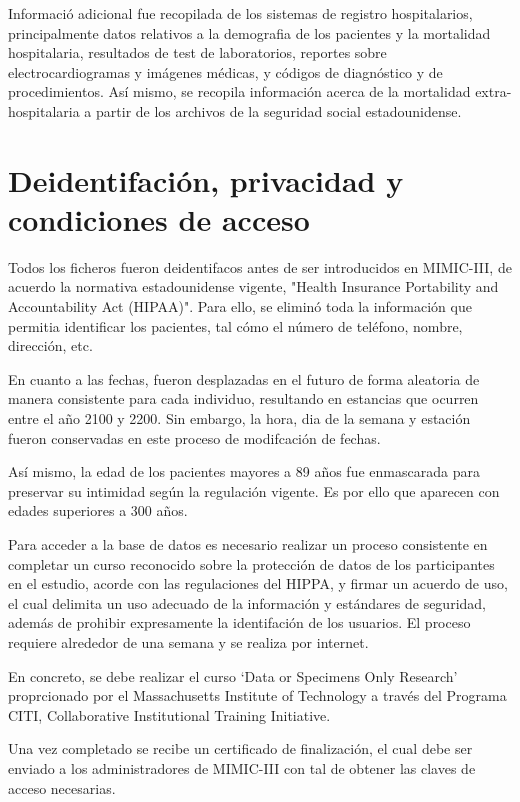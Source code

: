 \documentclass{report}
\begin{document}
Informació adicional fue recopilada de los sistemas de registro hospitalarios, principalmente datos relativos a la demografia de los pacientes y la mortalidad hospitalaria, resultados de test de laboratorios, reportes sobre electrocardiogramas y imágenes médicas, y códigos de diagnóstico y de procedimientos. Así mismo, se recopila información acerca de la mortalidad extra-hospitalaria a partir de los archivos de la seguridad social estadounidense. 


\section{Deidentifación, privacidad y condiciones de acceso}

Todos los ficheros fueron deidentifacos antes de ser introducidos en MIMIC-III, de acuerdo la normativa estadounidense vigente, "Health Insurance Portability and Accountability Act (HIPAA)". Para ello, se eliminó toda la información que permitia identificar los pacientes, tal cómo el número de teléfono, nombre, dirección, etc. 

En cuanto a las fechas, fueron desplazadas en el futuro de forma aleatoria de manera consistente para cada individuo, resultando en estancias que ocurren entre el año 2100 y 2200. Sin embargo, la hora, dia de la semana y estación fueron conservadas en este proceso de modifcación de fechas. 

Así mismo, la edad de los pacientes mayores a 89 años fue enmascarada para preservar su intimidad según la regulación vigente. Es por ello que aparecen con edades superiores a 300 años. 

Para acceder a la base de datos es necesario realizar un proceso consistente en completar un curso reconocido sobre la protección de datos de los participantes en el estudio, acorde con las regulaciones del HIPPA, y firmar un acuerdo de uso, el cual delimita un uso adecuado de la información y estándares de seguridad, además de prohibir expresamente la identifación de los usuarios. El proceso requiere alrededor de una semana y se realiza por internet. 

En concreto, se debe realizar el curso  ‘Data or Specimens Only Research’ proprcionado por el Massachusetts Institute of Technology  a través del Programa CITI, Collaborative Institutional Training Initiative.  

Una vez completado se recibe un certificado de finalización, el cual debe ser enviado a los administradores de MIMIC-III con tal de obtener las claves de acceso necesarias.
\end{document}
